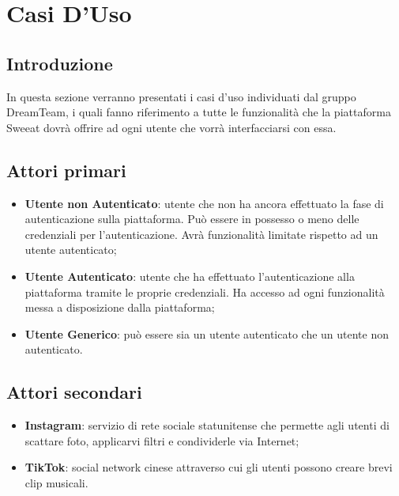 \section{Casi D'Uso}
\subsection{Introduzione}
In questa sezione verranno presentati i casi d’uso individuati dal gruppo DreamTeam, i quali fanno riferimento a tutte le funzionalità che la piattaforma Sweeat dovrà offrire ad ogni utente che vorrà interfacciarsi con essa.
\subsection{Attori primari}
\begin{itemize}
    \item \textbf{Utente non Autenticato}: utente che non ha ancora effettuato la fase di autenticazione sulla piattaforma. Può essere in possesso o meno delle credenziali per l’autenticazione. Avrà funzionalità limitate rispetto ad un utente autenticato;
    \item \textbf{Utente Autenticato}: utente che ha effettuato l’autenticazione alla piattaforma tramite le proprie credenziali. Ha accesso ad ogni funzionalità messa a disposizione dalla piattaforma;
    \item \textbf{Utente Generico}: può essere sia un utente autenticato che un utente non autenticato.
\end{itemize}
\subsection{Attori secondari}
\begin{itemize}
    \item \textbf{Instagram}: servizio di rete sociale statunitense che permette agli utenti di scattare foto, applicarvi filtri e condividerle via Internet;
    \item \textbf{TikTok}: social network cinese attraverso cui gli utenti possono creare brevi clip musicali.
\end{itemize}
\clearpage 